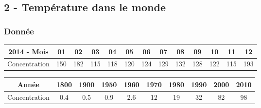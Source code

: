 \documentclass[12pt]{article}
\begin{document}
\subsection*{2 - Température dans le monde}

\subsubsection*{Donnée}

\begin{center}
  \begin{tabular}{| c || c | c | c | c | c | c | c | c | c | c | c | c |}
    \hline
    2014 - Mois          & 01 & 02 & 03 & 04 & 05 & 06 & 07 & 08 & 09 & 10 & 11 & 12 \\
    \hline
    Concentration & 150 & 182 & 115 & 118 & 120 & 124 & 129 & 132 & 128 & 122 & 115 & 193 \\
    \hline
  \end{tabular}
\end{center}

\begin{center}
  \begin{tabular}{| c || c | c | c | c | c | c | c | c | c |}
    \hline
    Année         & 1800 & 1900 & 1950 & 1960 & 1970 & 1980 & 1990 & 2000 & 2010\\
    \hline
    Concentration &  0.4 &  0.5  & 0.9 & 2.6  & 12   & 19   & 32   & 82   & 98  \\
    \hline
  \end{tabular}
\end{center}
\end{document}
